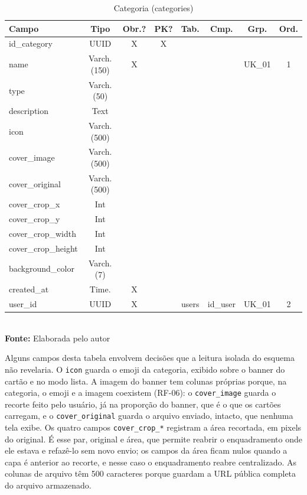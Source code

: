 \FloatBarrier
\begin{table}[!htbp]
\centering
\caption{Categoria (categories)}
\footnotesize
\begin{tabularx}{\textwidth}{ | X | c | c | c | c | c | c | c | }
    \hline
    \textbf{Campo} & \textbf{Tipo} & \textbf{Obr.?} & \textbf{PK?} & \textbf{Tab.} & \textbf{Cmp.} & \textbf{Grp.} & \textbf{Ord.}\\ \hline
    id\_category & UUID & X & X &  &  &  &  \\ \hline
    name & Varch.(150) & X &  &  &  & UK\_01 & 1 \\ \hline
    type & Varch.(50) &  &  &  &  &  &  \\ \hline
    description & Text &  &  &  &  &  &  \\ \hline
    icon & Varch.(500) &  &  &  &  &  &  \\ \hline
    cover\_image & Varch.(500) &  &  &  &  &  &  \\ \hline
    cover\_original & Varch.(500) &  &  &  &  &  &  \\ \hline
    cover\_crop\_x & Int &  &  &  &  &  &  \\ \hline
    cover\_crop\_y & Int &  &  &  &  &  &  \\ \hline
    cover\_crop\_width & Int &  &  &  &  &  &  \\ \hline
    cover\_crop\_height & Int &  &  &  &  &  &  \\ \hline
    background\_color & Varch.(7) &  &  &  &  &  &  \\ \hline
    created\_at & Time. & X &  &  &  &  &  \\ \hline
    user\_id & UUID & X &  & users & id\_user & UK\_01 & 2 \\ \hline
\end{tabularx}
\vspace{0.1cm} \\ \textbf{Fonte:} Elaborada pelo autor
\label{tab:tabelaCategoryDetalhado}
\end{table}

Alguns campos desta tabela envolvem decisões que a leitura isolada do esquema não revelaria. O
\texttt{icon} guarda o emoji da categoria, exibido sobre o banner do cartão e no modo lista. A
imagem do banner tem colunas próprias porque, na categoria, o emoji e a imagem coexistem (RF-06):
o \texttt{cover\_image} guarda o recorte feito pelo usuário, já na proporção do banner, que é o
que os cartões carregam, e o \texttt{cover\_original} guarda o arquivo enviado, intacto, que
nenhuma tela exibe. Os quatro campos \texttt{cover\_crop\_*} registram a área recortada, em pixels
do original. É esse par, original e área, que permite reabrir o enquadramento onde ele estava e
refazê-lo sem novo envio; os campos da área ficam nulos quando a capa é anterior ao recorte, e
nesse caso o enquadramento reabre centralizado. As colunas de arquivo têm 500 caracteres porque
guardam a URL pública completa do arquivo armazenado.

